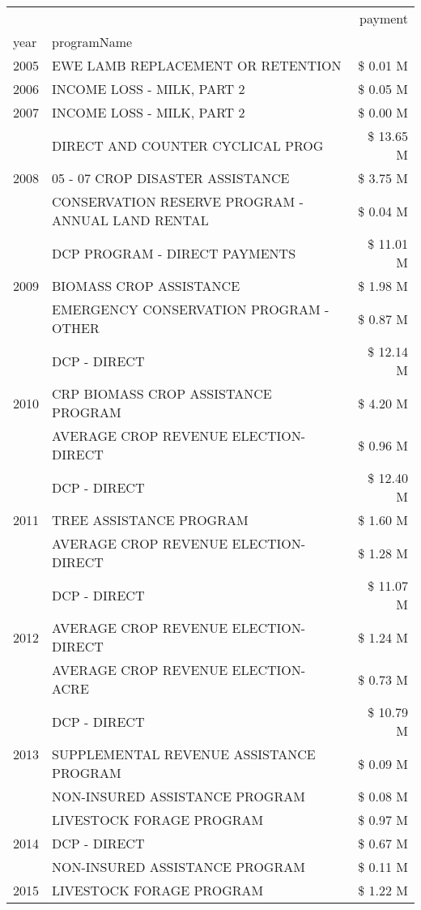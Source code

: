 \begin{tabular}{llr}
\toprule
 &  & payment \\
year & programName &  \\
\midrule
2005 & EWE LAMB REPLACEMENT OR RETENTION & \$ 0.01 M \\
\cline{1-3}
2006 & INCOME LOSS - MILK, PART 2 & \$ 0.05 M \\
\cline{1-3}
2007 & INCOME LOSS - MILK, PART 2 & \$ 0.00 M \\
\cline{1-3}
\multirow[t]{3}{*}{2008} & DIRECT AND COUNTER CYCLICAL PROG & \$ 13.65 M \\
 & 05 - 07 CROP DISASTER ASSISTANCE & \$ 3.75 M \\
 & CONSERVATION RESERVE PROGRAM - ANNUAL LAND RENTAL & \$ 0.04 M \\
\cline{1-3}
\multirow[t]{3}{*}{2009} & DCP PROGRAM - DIRECT PAYMENTS & \$ 11.01 M \\
 & BIOMASS CROP ASSISTANCE & \$ 1.98 M \\
 & EMERGENCY CONSERVATION PROGRAM - OTHER & \$ 0.87 M \\
\cline{1-3}
\multirow[t]{3}{*}{2010} & DCP - DIRECT & \$ 12.14 M \\
 & CRP BIOMASS CROP ASSISTANCE PROGRAM & \$ 4.20 M \\
 & AVERAGE CROP REVENUE ELECTION-DIRECT & \$ 0.96 M \\
\cline{1-3}
\multirow[t]{3}{*}{2011} & DCP - DIRECT & \$ 12.40 M \\
 & TREE ASSISTANCE PROGRAM & \$ 1.60 M \\
 & AVERAGE CROP REVENUE ELECTION-DIRECT & \$ 1.28 M \\
\cline{1-3}
\multirow[t]{3}{*}{2012} & DCP - DIRECT & \$ 11.07 M \\
 & AVERAGE CROP REVENUE ELECTION-DIRECT & \$ 1.24 M \\
 & AVERAGE CROP REVENUE ELECTION-ACRE & \$ 0.73 M \\
\cline{1-3}
\multirow[t]{3}{*}{2013} & DCP - DIRECT & \$ 10.79 M \\
 & SUPPLEMENTAL REVENUE ASSISTANCE PROGRAM & \$ 0.09 M \\
 & NON-INSURED ASSISTANCE PROGRAM & \$ 0.08 M \\
\cline{1-3}
\multirow[t]{3}{*}{2014} & LIVESTOCK FORAGE PROGRAM & \$ 0.97 M \\
 & DCP - DIRECT & \$ 0.67 M \\
 & NON-INSURED ASSISTANCE PROGRAM & \$ 0.11 M \\
\cline{1-3}
\multirow[t]{3}{*}{2015} & LIVESTOCK FORAGE PROGRAM & \$ 1.22 M \\

\end{tabular}

